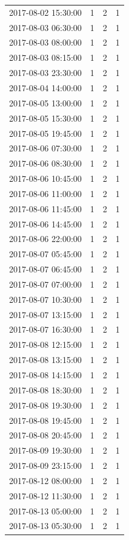 \begin{tabular}{lrrr}
2017-08-02 15:30:00 & 1 & 2 & 1 \\
2017-08-03 06:30:00 & 1 & 2 & 1 \\
2017-08-03 08:00:00 & 1 & 2 & 1 \\
2017-08-03 08:15:00 & 1 & 2 & 1 \\
2017-08-03 23:30:00 & 1 & 2 & 1 \\
2017-08-04 14:00:00 & 1 & 2 & 1 \\
2017-08-05 13:00:00 & 1 & 2 & 1 \\
2017-08-05 15:30:00 & 1 & 2 & 1 \\
2017-08-05 19:45:00 & 1 & 2 & 1 \\
2017-08-06 07:30:00 & 1 & 2 & 1 \\
2017-08-06 08:30:00 & 1 & 2 & 1 \\
2017-08-06 10:45:00 & 1 & 2 & 1 \\
2017-08-06 11:00:00 & 1 & 2 & 1 \\
2017-08-06 11:45:00 & 1 & 2 & 1 \\
2017-08-06 14:45:00 & 1 & 2 & 1 \\
2017-08-06 22:00:00 & 1 & 2 & 1 \\
2017-08-07 05:45:00 & 1 & 2 & 1 \\
2017-08-07 06:45:00 & 1 & 2 & 1 \\
2017-08-07 07:00:00 & 1 & 2 & 1 \\
2017-08-07 10:30:00 & 1 & 2 & 1 \\
2017-08-07 13:15:00 & 1 & 2 & 1 \\
2017-08-07 16:30:00 & 1 & 2 & 1 \\
2017-08-08 12:15:00 & 1 & 2 & 1 \\
2017-08-08 13:15:00 & 1 & 2 & 1 \\
2017-08-08 14:15:00 & 1 & 2 & 1 \\
2017-08-08 18:30:00 & 1 & 2 & 1 \\
2017-08-08 19:30:00 & 1 & 2 & 1 \\
2017-08-08 19:45:00 & 1 & 2 & 1 \\
2017-08-08 20:45:00 & 1 & 2 & 1 \\
2017-08-09 19:30:00 & 1 & 2 & 1 \\
2017-08-09 23:15:00 & 1 & 2 & 1 \\
2017-08-12 08:00:00 & 1 & 2 & 1 \\
2017-08-12 11:30:00 & 1 & 2 & 1 \\
2017-08-13 05:00:00 & 1 & 2 & 1 \\
2017-08-13 05:30:00 & 1 & 2 & 1 \\

\end{tabular}
